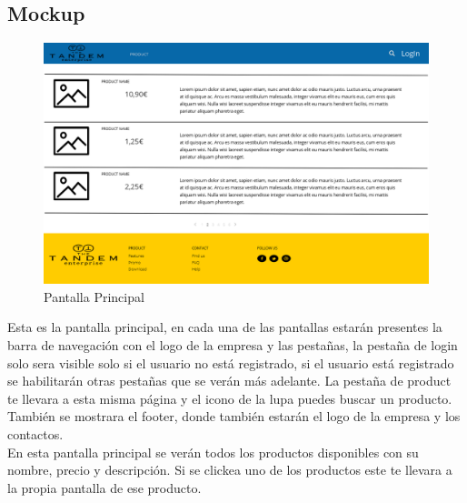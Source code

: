 \documentclass{article}
\begin{document}
\subsection{Mockup}
\begin{figure}[h]
    \centering
    \includegraphics[scale=0.25]{mockup/Inicio.png}
    \caption{Pantalla Principal}
    \label{Fig:Inicio}
\end{figure}
\quad Esta es la pantalla principal, en cada una de las pantallas estarán presentes la barra de navegación con el logo de la empresa y las pestañas, la pestaña de login solo sera visible solo si el usuario no está registrado, si el usuario está registrado se habilitarán otras pestañas que se verán más adelante.
La pestaña de product te llevara a esta misma página y el icono de la lupa puedes buscar un producto.\\
También se mostrara el footer, donde también estarán el logo de la empresa y los contactos.\\
En esta pantalla principal se verán todos los productos disponibles con su nombre, precio y descripción. Si se clickea uno de los productos este te llevara a la propia pantalla de ese producto. 
\end{document}
